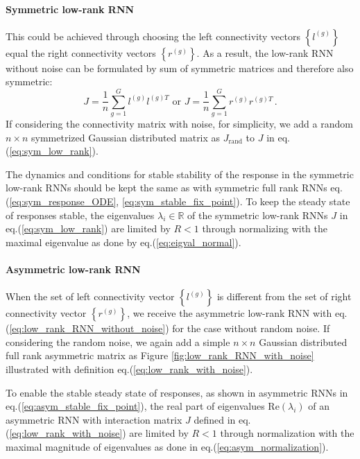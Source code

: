 \documentclass[11pt]{article}
\begin{document}
{	\paragraph{Symmetric low-rank RNN}This could be achieved through choosing the left connectivity vectors $\left\{l^{(g)}\right\}$ equal the right connectivity vectors $\left\{r^{(g)}\right\}$. As a result, the low-rank RNN without noise can be formulated by sum of symmetric matrices and therefore also symmetric:
		\begin{equation} \label{eq:sym_low_rank}
			J = \frac{1}{n}\sum_{g =1}^{G} l^{(g)} l^{(g)T} \, \, \text{or} \, \, J = \frac{1}{n}\sum_{g =1}^{G} r^{(g)} r^{(g)T} \, .
		\end{equation}
	If considering the connectivity matrix with noise, for simplicity, we add a random $n \times n$ symmetrized Gaussian distributed matrix as $J_{\text{rand}}$ to $J$ in eq.(\ref{eq:sym_low_rank}).
	
	The dynamics and conditions for stable stability of the response in the symmetric low-rank RNNs should be kept the same as with symmetric full rank RNNs eq.(\ref{eq:sym_response_ODE}, \ref{eq:sym_stable_fix_point}). To keep the steady state of responses stable, the eigenvalues $\lambda_i \in \mathbb{R}$ of the symmetric low-rank RNNs $J$ in eq.(\ref{eq:sym_low_rank}) are limited by $R < 1$ through normalizing with the maximal eigenvalue as done by eq.(\ref{eq:eigval_normal}). 
	
	\paragraph{Asymmetric low-rank RNN} When the set of left connectivity vector  $\left\{l^{(g)}\right\}$ is different from the set of right connectivity vector $\left\{r^{(g)}\right\}$, we receive the asymmetric low-rank RNN with eq.(\ref{eq:low_rank_RNN_without_noise}) for the case without random noise. If considering the random noise, we again add a simple $n \times n$ Gaussian distributed full rank asymmetric matrix as Figure \ref{fig:low_rank_RNN_with_noise} illustrated with definition  eq.(\ref{eq:low_rank_with_noise}). 
	
	To enable the stable steady state of responses, as shown in asymmetric RNNs in eq.(\ref{eq:asym_stable_fix_point}), the real part of eigenvalues $\text{Re}(\lambda_i)$ of an asymmetric RNN with interaction matrix $J$ defined in eq.(\ref{eq:low_rank_with_noise}) are limited by $R < 1$ through normalization with the maximal magnitude of eigenvalues as done in eq.(\ref{eq:asym_normalization}). 
	
}
\end{document}

